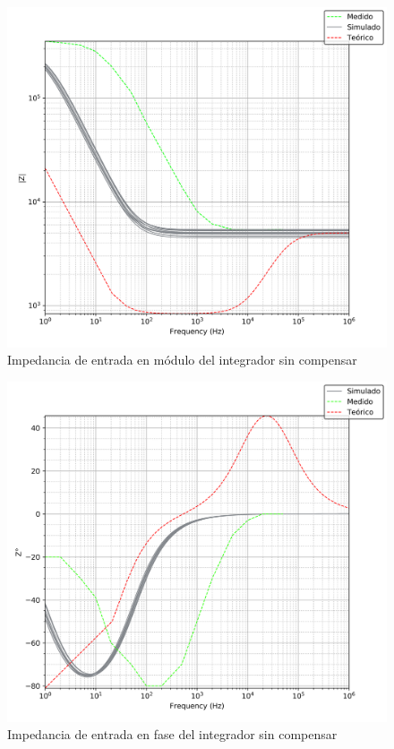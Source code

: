\begin{figure}[H]
	\centering
	\includegraphics[scale=0.7]{../EJ4/Recursos/Integrador/impedancia_modulo.png}
	\caption{Impedancia de entrada en m\'odulo del integrador sin compensar}
	\label{fig:integrador_impedancia_modulo}
\end{figure}

\begin{figure}[H]
	\centering
	\includegraphics[scale=0.7]{../EJ4/Recursos/Integrador/impedancia_fase.png}
	\caption{Impedancia de entrada en fase del integrador sin compensar}
	\label{fig:integrador_impedancia_fase}
\end{figure}


